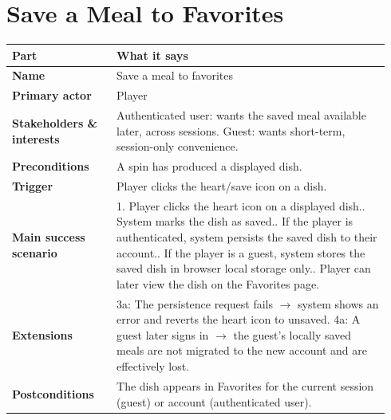 \documentclass[11pt,twocolumn]{article}
\newcommand{\ucheader}{%
\textbf{Part} & \textbf{What it says} \\
\hline
\endhead
\hline
\endfoot
}
\begin{document}
\section{Save a Meal to Favorites}
{\footnotesize
\begin{longtable}{@{}p{0.26\linewidth}p{0.68\linewidth}@{}}
\hline
\ucheader
\textbf{Name} & Save a meal to favorites \\
\hline
\textbf{Primary actor} & Player \\
\hline
\textbf{Stakeholders \& interests} & Authenticated user: wants the saved meal available later, across sessions. Guest: wants short-term, session-only convenience. \\
\hline
\textbf{Preconditions} & A spin has produced a displayed dish. \\
\hline
\textbf{Trigger} & Player clicks the heart/save icon on a dish. \\
\hline
\textbf{Main success scenario} & 1. Player clicks the heart icon on a displayed dish.\newline
2. System marks the dish as saved.\newline
3. If the player is authenticated, system persists the saved dish to their account.\newline
4. If the player is a guest, system stores the saved dish in browser local storage only.\newline
5. Player can later view the dish on the Favorites page. \\
\hline
\textbf{Extensions} & 3a: The persistence request fails $\rightarrow$ system shows an error and reverts the heart icon to unsaved.\newline
4a: A guest later signs in $\rightarrow$ the guest's locally saved meals are not migrated to the new account and are effectively lost. \\
\hline
\textbf{Postconditions} & The dish appears in Favorites for the current session (guest) or account (authenticated user). \\
\hline
\end{longtable}
}
\end{document}
